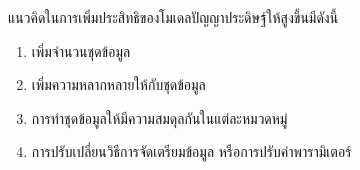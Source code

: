 แนวคิดในการเพิ่มประสิทธิของโมเดลปัญญาประดิษฐ์ให้สูงขึ้นมีดังนี้
\begin{enumerate}
	\item เพิ่มจำนวนชุดข้อมูล
	\item เพิ่มความหลากหลายให้กับชุดข้อมูล
	\item การทำชุดข้อมูลให้มีความสมดุลกันในแต่ละหมวดหมู่
	\item การปรับเปลี่ยนวิธีการจัดเตรียมข้อมูล หรือการปรับค่าพารามิเตอร์
\end{enumerate}